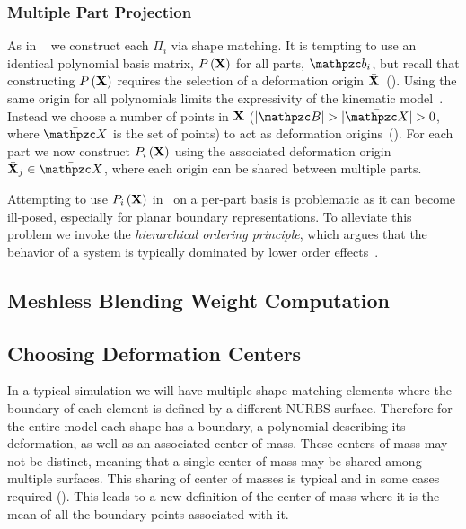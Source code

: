  \subsubsection*{Multiple Part Projection}
As in ~ we construct each $\Pi_i$ via shape matching. 
It is tempting to use an identical polynomial basis matrix, $P\left(\mathbf{X}\right)$ for all parts, $\prt_i$, but recall that constructing $P\left(\mathbf{X}\right)$ requires the selection of a deformation
origin $\bar{\mathbf{X}}$~(). 
Using the same origin for all polynomials limits the expressivity of the kinematic model~\cite{STBS:2011}.
Instead we choose a number of points in $\mathbf{X}$ ($|\Prts| > |\XBs| > 0$, where $\XBs$ is the set of points)  to act as deformation origins~().
For each part we now construct $P_i\left(\mathbf{X} \right)$ using the associated deformation origin $\bar{\refX}_j\in \XBs$, where each origin can
be shared between multiple parts.

Attempting to use $P_i\left(\mathbf{X} \right)$ in~ on a per-part basis is problematic as it can become ill-posed, especially for planar boundary representations. 
To alleviate this problem we invoke the \emph{hierarchical ordering principle}, which argues that the behavior of a system is typically 
dominated by lower order effects~\cite{li2006regularities}. 


\subsection{Meshless Blending Weight Computation}
\label{sec:weights}

\subsection{Choosing Deformation Centers}
\label{sec:origins}




In a typical simulation we will have multiple shape matching elements where the boundary of each element is defined by a different NURBS surface. Therefore for the entire model each shape has a boundary, a polynomial describing its deformation, as well as an associated center of mass. These centers of mass may not be distinct, meaning that a single center of mass may be shared among multiple surfaces. This sharing of center of masses is typical and in some cases required (). This leads to a new definition of the center of mass where it is the mean of all the boundary points associated with it.

